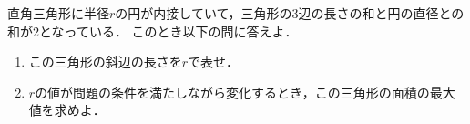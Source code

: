 \documentclass[../../main.tex]{subfiles}
\begin{document}
直角三角形に半径$r$の円が内接していて，三角形の3辺の長さの和と円の直径との和が2となっている．
このとき以下の問に答えよ．
\begin{enumerate}
  \item この三角形の斜辺の長さを$r$で表せ．
  \item $r$の値が問題の条件を満たしながら変化するとき，この三角形の面積の最大値を求めよ．
\end{enumerate}
\end{document}
